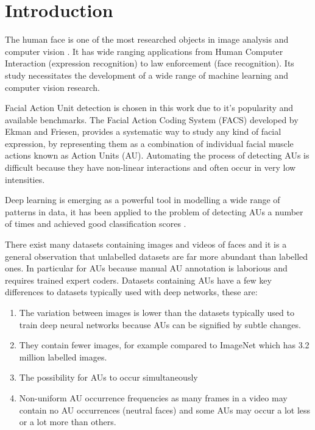 \chapter{Introduction} \label{chap:intro}

  The human face is one of the most researched objects in image analysis
  and computer vision \cite{S.ZafeiriouA.PapaioannouI.KotsiaM.A.Nicolaou}.
  It has wide ranging applications from Human
  Computer Interaction (expression recognition) to law enforcement (face recognition).
  Its study necessitates the development of a wide range of machine
  learning and computer vision research.

  Facial Action Unit detection \cite{Corneanu2016} is chosen in this work due
  to it's popularity and available benchmarks.
  The Facial Action Coding System (FACS) developed by Ekman and Friesen,
  provides a systematic way to study any kind of facial expression,
  by representing them as a combination of individual facial muscle actions
  known as Action Units (AU). Automating the process of detecting AUs is difficult
  because they have non-linear interactions \cite{S.EleftheriadisO.Rudovic}
  and often occur in very low intensities.

  Deep learning is emerging as a powerful tool in modelling a wide range of patterns
  in data, it has been applied to the problem of detecting AUs a number of times and achieved
  good classification scores \cite{Khorrami2015,Jaiswal2016,Kim2016,Gudi2015,Ghosh2015}.

  There exist many datasets containing images and videos of faces and it is a general
  observation that unlabelled datasets are far more abundant than labelled ones.
  In particular for AUs because manual AU
  annotation is laborious and requires trained expert coders.
  Datasets containing AUs have a few key differences to datasets typically used with
  deep networks, these are:
  \begin{enumerate}
    \item The variation between images is lower than the datasets typically used
    to train deep neural networks because AUs can be signified by subtle changes.
    \item They contain fewer images, for example compared to ImageNet\cite{Deng2009} which has 3.2 million labelled images.
    \item The possibility for AUs to occur simultaneously
    \item Non-uniform AU occurrence frequencies as many frames in a video may
    contain no AU occurrences (neutral faces) and some AUs may occur a lot less or a lot more than others.
  \end{enumerate}

